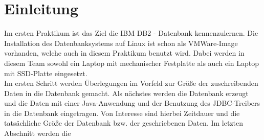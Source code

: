 \chapter{Einleitung}
Im ersten Praktikum ist das Ziel die IBM DB2 - Datenbank kennenzulernen. Die Installation des Datenbanksystems auf Linux ist schon als VMWare-Image vorhanden, welche auch in diesem Praktikum benutzt wird. Dabei werden in diesem Team sowohl ein Laptop mit mechanischer Festplatte als auch ein Laptop mit SSD-Platte eingesetzt.\\

Im ersten Schritt werden Überlegungen im Vorfeld zur Größe der zuschreibenden Daten in die Datenbank gemacht. Als nächstes werden die Datenbank erzeugt und die Daten mit einer Java-Anwendung und der Benutzung des JDBC-Treibers in die Datenbank eingetragen. Von Interesse sind hierbei Zeitdauer und die tatsächliche Größe der Datenbank bzw. der geschriebenen Daten. Im letzten Abschnitt werden die
